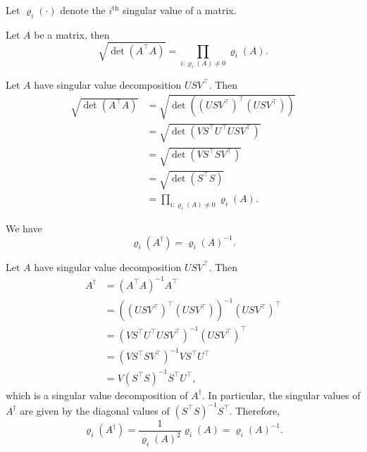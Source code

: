 \begin{tproof}

    Let $\varrho_i(\cdot)$ denote the $i^\text{th}$ singular value of a matrix.

    \begin{plemma}\label{lem:det_gram_matrix}
        Let $A$ be a matrix, then $$\sqrt{\det\left(A^\top A\right)}=\prod_{i:\varrho_i(A)\neq0}\varrho_i(A).$$
    \end{plemma}

    \begin{pproof}
        Let $A$ have singular value decomposition $USV^\top$. Then
        \begin{align*}
            \sqrt{\det\left(A^\top A\right)}&=\sqrt{\det\left(\left(USV^\top\right)^\top\left(USV^\top\right)\right)}\\&=\sqrt{\det\left(VS^\top U^\top USV^\top\right)}\\&=\sqrt{\det\left(VS^\top SV^\top\right)}\\&=\sqrt{\det\left(S^\top S\right)}\\&=\prod_{i:\varrho_i(A)\neq0}\varrho_i(A).
        \end{align*}
    \end{pproof}

    \begin{plemma}\label{lem:singular_values_plus_matrix}
        We have $$\varrho_i\left(A^{\dagger}\right)=\varrho_i(A)^{-1}.$$
    \end{plemma}

    \begin{pproof}
        Let $A$ have singular value decomposition $USV^\top$. Then
        \begin{align*}
            A^{\dagger}&=\left(A^\top A\right)^{-1}A^\top\\&=\left(\left(USV^\top\right)^\top\left(USV^\top\right)\right)^{-1}\left(USV^\top\right)^\top\\&=\left(VS^\top U^\top USV^\top\right)^{-1}\left(USV^\top\right)^\top\\&=\left(VS^\top SV^\top\right)^{-1}VS^\top U^\top\\&=V\left(S^\top S\right)^{-1}S^\top U^\top,
        \end{align*}
        which is a singular value decomposition of $A^{\dagger}$. In particular, the singular values of $A^{\dagger}$ are given by the diagonal values of $\left(S^\top S\right)^{-1}S^\top$. Therefore, $$\varrho_i\left(A^{\dagger}\right)=\frac{1}{\varrho_i(A)^2}\varrho_i(A)=\varrho_i(A)^{-1}.$$
    \end{pproof}


\end{tproof}
